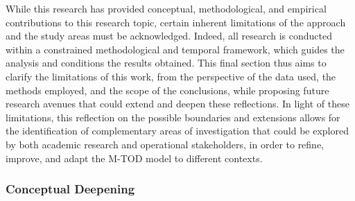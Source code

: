 \begin{refsegment}
While this research has provided conceptual, methodological, and empirical contributions to this research topic, certain inherent limitations of the approach and the study areas must be acknowledged. Indeed, all research is conducted within a constrained methodological and temporal framework, which guides the analysis and conditions the results obtained. This final section thus aims to clarify the limitations of this work, from the perspective of the data used, the methods employed, and the scope of the conclusions, while proposing future research avenues that could extend and deepen these reflections. In light of these limitations, this reflection on the possible boundaries and extensions allows for the identification of complementary areas of investigation that could be explored by both academic research and operational stakeholders, in order to refine, improve, and adapt the \acrshort{M-TOD} model to different contexts.%

\subsubsection*{Conceptual Deepening
    \label{conclusion-generale:perspectives-pistes-theoriques}
    }


\end{refsegment}
